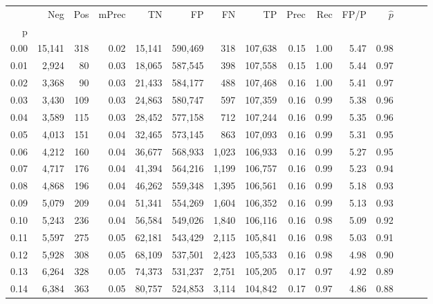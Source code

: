 \begin{tabular}{rrrrrrrrrrrrrrr}
\toprule
{} &     Neg &    Pos & mPrec &       TN &       FP &       FN &       TP &  Prec &   Rec &  FP/P & $\hat{p}$ \\
p    &         &        &       &          &          &          &          &       &       &       &           \\
\midrule
0.00 &  15,141 &    318 &  0.02 &   15,141 &  590,469 &      318 &  107,638 &  0.15 &  1.00 &  5.47 &      0.98 \\
0.01 &   2,924 &     80 &  0.03 &   18,065 &  587,545 &      398 &  107,558 &  0.15 &  1.00 &  5.44 &      0.97 \\
0.02 &   3,368 &     90 &  0.03 &   21,433 &  584,177 &      488 &  107,468 &  0.16 &  1.00 &  5.41 &      0.97 \\
0.03 &   3,430 &    109 &  0.03 &   24,863 &  580,747 &      597 &  107,359 &  0.16 &  0.99 &  5.38 &      0.96 \\
0.04 &   3,589 &    115 &  0.03 &   28,452 &  577,158 &      712 &  107,244 &  0.16 &  0.99 &  5.35 &      0.96 \\
0.05 &   4,013 &    151 &  0.04 &   32,465 &  573,145 &      863 &  107,093 &  0.16 &  0.99 &  5.31 &      0.95 \\
0.06 &   4,212 &    160 &  0.04 &   36,677 &  568,933 &    1,023 &  106,933 &  0.16 &  0.99 &  5.27 &      0.95 \\
0.07 &   4,717 &    176 &  0.04 &   41,394 &  564,216 &    1,199 &  106,757 &  0.16 &  0.99 &  5.23 &      0.94 \\
0.08 &   4,868 &    196 &  0.04 &   46,262 &  559,348 &    1,395 &  106,561 &  0.16 &  0.99 &  5.18 &      0.93 \\
0.09 &   5,079 &    209 &  0.04 &   51,341 &  554,269 &    1,604 &  106,352 &  0.16 &  0.99 &  5.13 &      0.93 \\
0.10 &   5,243 &    236 &  0.04 &   56,584 &  549,026 &    1,840 &  106,116 &  0.16 &  0.98 &  5.09 &      0.92 \\
0.11 &   5,597 &    275 &  0.05 &   62,181 &  543,429 &    2,115 &  105,841 &  0.16 &  0.98 &  5.03 &      0.91 \\
0.12 &   5,928 &    308 &  0.05 &   68,109 &  537,501 &    2,423 &  105,533 &  0.16 &  0.98 &  4.98 &      0.90 \\
0.13 &   6,264 &    328 &  0.05 &   74,373 &  531,237 &    2,751 &  105,205 &  0.17 &  0.97 &  4.92 &      0.89 \\
0.14 &   6,384 &    363 &  0.05 &   80,757 &  524,853 &    3,114 &  104,842 &  0.17 &  0.97 &  4.86 &      0.88 \\

\end{tabular}
